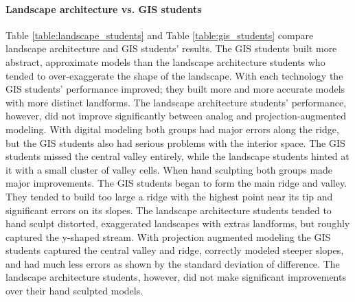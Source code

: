 \paragraph{Landscape architecture vs. GIS students}
%
Table \ref{table:landscape_students} and
Table \ref{table:gis_students}
compare landscape architecture and GIS students' results.
%
The GIS students built more abstract, approximate models
than the landscape architecture students who tended to 
over-exaggerate the shape of the landscape.
%
With each technology the GIS students' 
performance improved;
they built more and more accurate models 
with more distinct landforms.
The landscape architecture students' performance, however, 
did not improve significantly between
analog and projection-augmented modeling. 
With digital modeling both groups
had major errors along the ridge,
but the GIS students also had serious problems
with the interior space.
The GIS students missed
the central valley entirely, while the landscape students
hinted at it with a small cluster of valley cells. 
%
When hand sculpting 
both groups made major improvements.
The GIS students began to form
the main ridge and valley. 
They tended to build too large a ridge
with the highest point near its tip
and significant errors on its slopes. 
The landscape architecture students tended to 
hand sculpt distorted, exaggerated landscapes 
with extras landforms, 
but roughly captured the y-shaped stream. 
%
With projection augmented modeling 
the GIS students captured
the central valley and ridge,
correctly modeled steeper slopes,
and had much less errors as shown by 
the standard deviation of difference.
%
The landscape architecture students, however,
did not make significant improvements 
over their hand sculpted models. 

